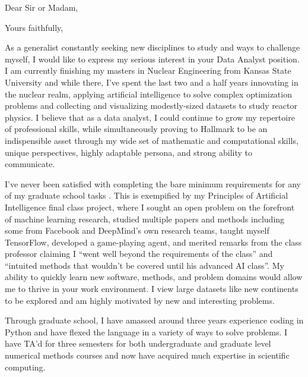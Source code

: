 \documentclass[11pt,a4paper,sans]{moderncv}        %
\begin{document}
\date{July 01, 2019}
\opening{Dear Sir or Madam,}
\closing{Yours faithfully,}
\makelettertitle


As a generalist constantly seeking new disciplines to study and ways to challenge myself, I would like to express my serious interest in your Data Analyst position.
I am currently finishing my masters in Nuclear Engineering from Kansas State University and while there, I've spent the last two and a half years innovating in the nuclear realm, applying artificial intelligence to solve complex optimization problems and collecting and visualizing modestly-sized datasets to study reactor physics.
I believe that as a data analyst, I could continue to grow my repertoire of professional skills, while simultaneously proving to Hallmark to be an indispensible asset through my wide set of mathematic and computational skills, unique perspectives, highly adaptable persona, and strong ability to communicate.


I've never been satisfied with completing the bare minimum requirements for any of my graduate school tasks .
This is exempified by my Principles of Artificial Intelligence final class project, where I sought an open problem on the forefront of machine learning research, studied multiple papers and methods including some from Facebook and DeepMind's own research teams, taught myself TensorFlow, developed a game-playing agent, and merited remarks from the class professor claiming I ``went well beyond the requirements of the class'' and ``intuited methods that wouldn't be covered until his advanced AI class''.
My ability to quickly learn new software, methods, and problem domains would allow me to thrive in your work environment.
I view large datasets like new continents to be explored and am highly motivated by new and interesting problems.

Through graduate school, I have amassed around three years experience coding in Python and have flexed the language in a variety of ways to solve problems.
I have TA'd for three semesters for both undergraduate and graduate level numerical methods courses and now have acquired much expertise in scientific computing.
\end{document}
